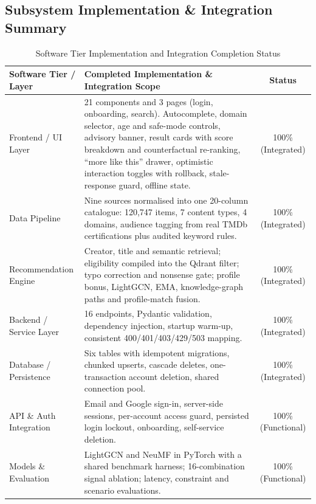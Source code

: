 \documentclass[11pt, a4paper]{article}
\begin{document}
\subsection{Subsystem Implementation \& Integration Summary}
\begin{table}[H]
    \centering
    \footnotesize
    \renewcommand{\arraystretch}{1.25}
    \begin{tabular}{|L{3.1cm}|L{9.9cm}|c|}
        \hline
        \textbf{Software Tier / Layer} & \textbf{Completed Implementation \& Integration Scope} & \textbf{Status} \\
        \hline
        Frontend / UI Layer & 21 components and 3 pages (login, onboarding, search). Autocomplete, domain selector, age and safe-mode controls, advisory banner, result cards with score breakdown and counterfactual re-ranking, ``more like this'' drawer, optimistic interaction toggles with rollback, stale-response guard, offline state. & 100\% (Integrated) \\
        \hline
        Data Pipeline & Nine sources normalised into one 20-column catalogue: 120,747 items, 7 content types, 4 domains, audience tagging from real TMDb certifications plus audited keyword rules. & 100\% (Integrated) \\
        \hline
        Recommendation Engine & Creator, title and semantic retrieval; eligibility compiled into the Qdrant filter; typo correction and nonsense gate; profile bonus, LightGCN, EMA, knowledge-graph paths and profile-match fusion. & 100\% (Integrated) \\
        \hline
        Backend / Service Layer & 16 endpoints, Pydantic validation, dependency injection, startup warm-up, consistent 400/401/403/429/503 mapping. & 100\% (Integrated) \\
        \hline
        Database / Persistence & Six tables with idempotent migrations, chunked upserts, cascade deletes, one-transaction account deletion, shared connection pool. & 100\% (Integrated) \\
        \hline
        API \& Auth Integration & Email and Google sign-in, server-side sessions, per-account access guard, persisted login lockout, onboarding, self-service deletion. & 100\% (Functional) \\
        \hline
        Models \& Evaluation & LightGCN and NeuMF in PyTorch with a shared benchmark harness; 16-combination signal ablation; latency, constraint and scenario evaluations. & 100\% (Functional) \\
        \hline
    \end{tabular}
    \caption{Software Tier Implementation and Integration Completion Status}
\end{table}
\end{document}
